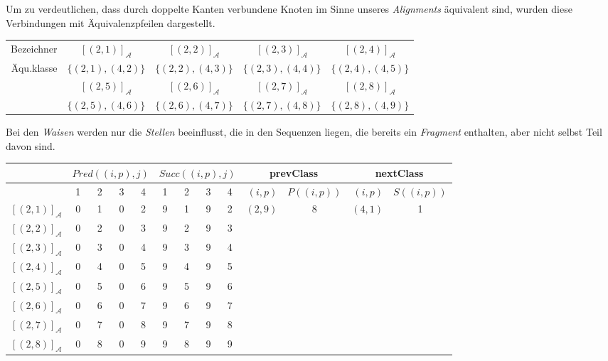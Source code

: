 Um zu verdeutlichen, dass durch doppelte Kanten verbundene Knoten im Sinne unseres \emph{Alignments} äquivalent sind, wurden diese Verbindungen mit Äquivalenzpfeilen dargestellt.

\small
\begin{tabular}{r||c|c|c|c}
	Bezeichner 	& $[(2,1)]_{\mathcal{A}}$ & $[(2,2)]_{\mathcal{A}}$ & $[(2,3)]_{\mathcal{A}}$ & $[(2,4)]_{\mathcal{A}}$\\
	Äqu.klasse  & $\{(2,1),(4,2)\}$	      & $\{(2,2),(4,3)\}$       & $\{(2,3),(4,4)\}$       & $\{(2,4),(4,5)\}$        \\
	\hline
	            & $[(2,5)]_{\mathcal{A}}$ & $[(2,6)]_{\mathcal{A}}$ & $[(2,7)]_{\mathcal{A}}$ & $[(2,8)]_{\mathcal{A}}$\\
	            & $\{(2,5),(4,6)\}$       & $\{(2,6),(4,7)\}$       & $\{(2,7),(4,8)\}$       & $\{(2,8),(4,9)\}$  
\end{tabular}
\normalsize

Bei den \emph{Waisen} werden nur die \emph{Stellen} beeinflusst, die in den Sequenzen liegen, die bereits ein \emph{Fragment} enthalten, aber nicht selbst Teil davon sind.

\vspace{5pt}

\small
\begin{tabular}{r|cccc|cccc||r|c|r|c}
	 & \multicolumn{4}{c|}{$Pred((i,p),j)$} & \multicolumn{4}{c||}{$Succ((i,p),j)$} & \multicolumn{2}{c|}{\textrm{prevClass}} & \multicolumn{2}{c}{\textrm{nextClass}} \\ \hline
	\diagbox[dir=NW]{$(i,p)$}{$j$} & 1 & 2 & 3 & 4 & 1 & 2 & 3 & 4 & $(i,p)$ & $P((i,p))$ & $(i,p)$ & $S((i,p))$ \\ \hline
	$[(2,1)]_{\mathcal{A}}$ & 0 & 1 & 0 & 2 & 9 & 1 & 9 & 2 & $(2,9)$ & 8 & $(4,1)$ & 1 \\
	$[(2,2)]_{\mathcal{A}}$ & 0 & 2 & 0 & 3 & 9 & 2 & 9 & 3 & & & & \\
	$[(2,3)]_{\mathcal{A}}$ & 0 & 3 & 0 & 4 & 9 & 3 & 9 & 4 & & & & \\
	$[(2,4)]_{\mathcal{A}}$ & 0 & 4 & 0 & 5 & 9 & 4 & 9 & 5 & & & & \\
	$[(2,5)]_{\mathcal{A}}$ & 0 & 5 & 0 & 6 & 9 & 5 & 9 & 6 & & & & \\
	$[(2,6)]_{\mathcal{A}}$ & 0 & 6 & 0 & 7 & 9 & 6 & 9 & 7 & & & & \\
	$[(2,7)]_{\mathcal{A}}$ & 0 & 7 & 0 & 8 & 9 & 7 & 9 & 8 & & & & \\
	$[(2,8)]_{\mathcal{A}}$ & 0 & 8 & 0 & 9 & 9 & 8 & 9 & 9 & & & & 
\end{tabular}
\normalsize
\vspace{5pt}

